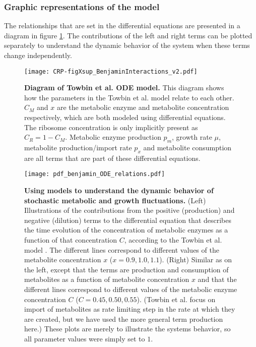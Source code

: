 \subsubsection*{Graphic representations of the model}

The relationships that are set in the differential equations are presented in a diagram in figure \ref{fig:CRP:benjamin_ODEs_diagram}.
%
The contributions of the left and right terms can be plotted separately to understand the dynamic behavior of the system when these terms change independently.

\begin{figure}
	\centering
	\texttt{[image: CRP-figXsup\_BenjaminInteractions\_v2.pdf]}
	\caption{ 
		\textbf{Diagram of Towbin et al. ODE model.}
		This diagram shows how the parameters in the Towbin et al. model relate to each other. $C_M$ and $x$ are the metabolic enzyme and metabolite concentration respectively, which are both modeled using differential equations. The ribosome concentration is only implicitly present as $C_R=1-C_M$. Metabolic enzyme production $p_m$, growth rate $\mu$, metabolite production/import rate $p_x$ and metabolite consumption are all terms that are part of these differential equations.
	}
	\label{fig:CRP:benjamin_ODEs_diagram}
\end{figure}


\begin{figure}
	\centering
	\texttt{[image: pdf\_benjamin\_ODE\_relations.pdf]}
	\caption{ 
		\textbf{Using models to understand the dynamic behavior of stochastic metabolic and growth fluctuations.}
		(Left) Illustrations of the contributions from the positive (production) and negative (dilution) terms to the differential equation that describes the time evolution of the concentration of metabolic enzymes as a function of that concentration $C$, according to the Towbin et al. model \cite{Towbin2017}. The different lines correspond to different values of the metabolite concentration $x$ ($x={0.9, 1.0, 1.1}$). 
		(Right)	Similar as on the left, except that the terms are production and consumption of metabolites as a function of metabolite concentration $x$ and that the different lines correspond to different values of the metabolic enzyme concentration $C$ ($C={0.45,0.50,0.55}$). (Towbin et al. focus on import of metabolites as rate limiting step in the rate at which they are created, but we have used the more general term production here.) 
		These plots are merely to illustrate the systems behavior, so all parameter values were simply set to $1$.
	}
	\label{fig:CRP:benjamin_ODEs}
\end{figure}





